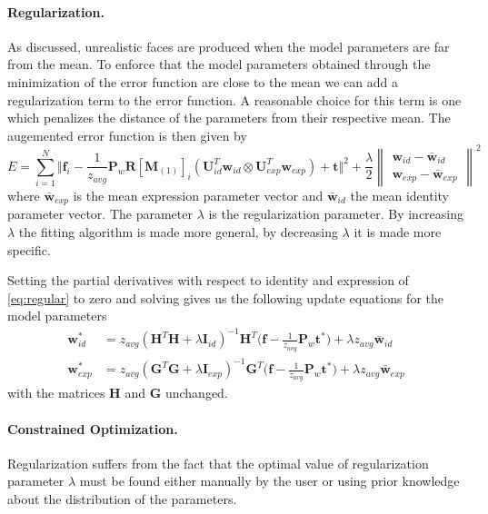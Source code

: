 \documentclass[11pt,a4paper]{report}
\begin{document}
\paragraph{Regularization.}
As discussed, unrealistic faces are produced when the model parameters are far
from the mean. To enforce that the model parameters obtained through the
minimization of the error function are close to the mean we can add a
regularization term to the error function. A reasonable choice for this term is
one which penalizes the distance of the parameters from their respective mean.
The augemented error function is then given by
\begin{equation}\label{eq:regular}
E = \sum_{i=1}^N \Big\Vert\mathbf{f}_i - \frac{1}{z_{avg}}\mathbf{P}_w\mathbf{R}[\mathbf{M}_{(1)}]_{i}(\mathbf{U}_{id}^T\mathbf{w}_{id} \otimes
\mathbf{U}_{exp}^T\mathbf{w}_{exp}) + \mathbf{t}\Big\Vert^2
+ \frac{\lambda}{2}\begin{Vmatrix}\mathbf{w}_{id} - \mathbf{\bar{w}}_{id}\\\mathbf{w}_{exp} - \mathbf{\bar{w}}_{exp}\end{Vmatrix}^2
\end{equation}
where $\mathbf{\bar{w}}_{exp}$ is the mean expression parameter vector and
$\mathbf{\bar{w}}_{id}$ the mean identity parameter vector. The parameter
$\lambda$ is the regularization parameter. By increasing $\lambda$ the fitting
algorithm is made more general, by decreasing $\lambda$ it is made more
specific. 

Setting the partial derivatives with respect to identity and expression of
\ref{eq:regular} to zero and solving gives us the following update equations for
the model parameters
\begin{align}
\mathbf{w}^*_{id} &=z_{avg}(\mathbf{H}^T\mathbf{H} + \lambda\mathbf{I}_{id})^{-1}\mathbf{H}^T\bigl(\mathbf{f}
- \frac{1}{z_{avg}}\mathbf{P}_w\mathbf{t}^*\bigr) + \lambda z_{avg}\mathbf{\bar{w}}_{id}\\
\mathbf{w}^*_{exp} &=z_{avg}(\mathbf{G}^T\mathbf{G} + \lambda\mathbf{I}_{exp})^{-1}\mathbf{G}^T\bigl(\mathbf{f} -
\frac{1}{z_{avg}}\mathbf{P}_w\mathbf{t}^*\bigr) + \lambda z_{avg}\mathbf{\bar{w}}_{exp}
\end{align}
with the matrices $\mathbf{H}$ and $\mathbf{G}$ unchanged.

\paragraph{Constrained Optimization.} Regularization suffers from the fact that
the optimal value of regularization parameter $\lambda$ must be found either
manually by the user or using prior knowledge about the distribution of the
parameters. 
\end{document}
